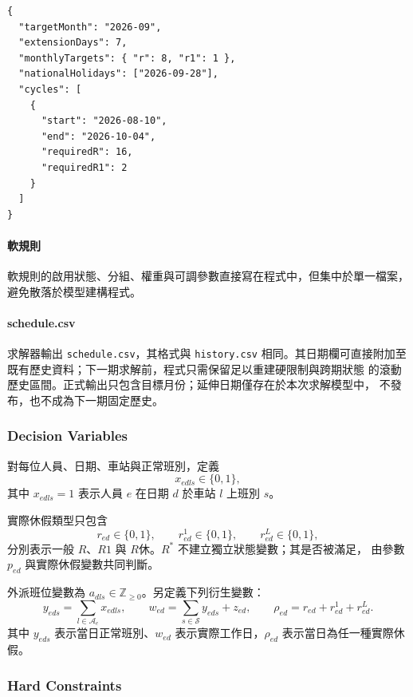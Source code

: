 \documentclass[12pt]{article}
\begin{document}
\begin{verbatim}
{
  "targetMonth": "2026-09",
  "extensionDays": 7,
  "monthlyTargets": { "r": 8, "r1": 1 },
  "nationalHolidays": ["2026-09-28"],
  "cycles": [
    {
      "start": "2026-08-10",
      "end": "2026-10-04",
      "requiredR": 16,
      "requiredR1": 2
    }
  ]
}
\end{verbatim}

\paragraph{軟規則}

軟規則的啟用狀態、分組、權重與可調參數直接寫在程式中，但集中於單一檔案，避免散落於模型建構程式。

\paragraph{schedule.csv}

求解器輸出 \texttt{schedule.csv}，其格式與 \texttt{history.csv} 相同。其日期欄可直接附加至既有歷史資料；下一期求解前，程式只需保留足以重建硬限制與跨期狀態
的滾動歷史區間。正式輸出只包含目標月份；延伸日期僅存在於本次求解模型中，
不發布，也不成為下一期固定歷史。

\subsubsection{Decision Variables}

對每位人員、日期、車站與正常班別，定義
\[
  x_{edls}\in\{0,1\},
\]
其中 \(x_{edls}=1\) 表示人員 \(e\) 在日期 \(d\) 於車站 \(l\) 上班別 \(s\)。

實際休假類型只包含
\[
  r_{ed}\in\{0,1\},
  \qquad
  r^{1}_{ed}\in\{0,1\},
  \qquad
  r^{L}_{ed}\in\{0,1\},
\]
分別表示一般 \(R\)、\(R1\) 與 \(R休\)。\(R^*\) 不建立獨立狀態變數；其是否被滿足，
由參數 \(p_{ed}\) 與實際休假變數共同判斷。

外派班位變數為 \(a_{dls}\in\mathbb{Z}_{\geq 0}\)。另定義下列衍生變數：
\[
  y_{eds}=\sum_{l\in\mathcal{A}_e}x_{edls},
  \qquad
  w_{ed}=\sum_{s\in\mathcal{S}}y_{eds}+z_{ed},
  \qquad
  \rho_{ed}=r_{ed}+r^{1}_{ed}+r^{L}_{ed}.
\]
其中 \(y_{eds}\) 表示當日正常班別、\(w_{ed}\) 表示實際工作日，\(\rho_{ed}\)
表示當日為任一種實際休假。

\subsubsection{Hard Constraints}
\end{document}
